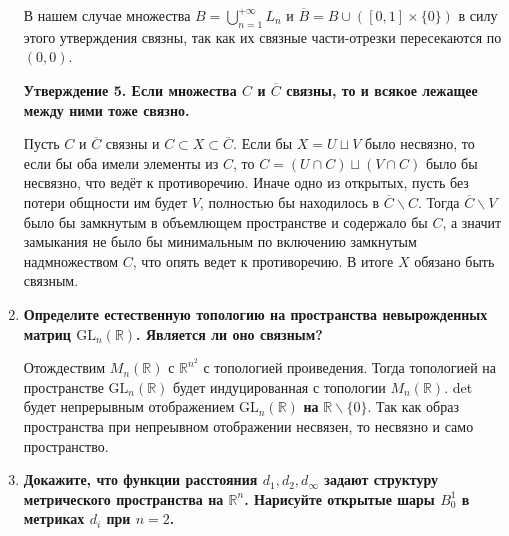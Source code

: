 \documentclass{article}
\begin{document}
\begin{enumerate}
    В нашем случае множества $B=\bigcup_{n=1}^{+\infty}L_n$ и $\overline{B}=B
    \cup([0,1]\times\{0\})$ в силу этого утверждения связны, так как их связные
    части-отрезки пересекаются по $(0,0)$.

    \textbf{Утверждение 5. Если множества $C$ и $\overline{C}$ связны, то и
    всякое лежащее между ними тоже связно.}

    Пусть $C$ и $\overline{C}$ связны и $C\subset X\subset\overline{C}$. Если
    бы $X=U\sqcup V$ было несвязно, то если бы оба имели элементы из $C$, то
    $C=(U\cap C)\sqcup (V\cap C)$ было бы несвязно, что ведёт к противоречию.
    Иначе одно из открытых, пусть без потери общности им будет $V$, полностью
    бы находилось в $\overline{C}\backslash C$. Тогда $\overline{C}\backslash V$
    было бы замкнутым в объемлющем пространстве и содержало бы $C$, а значит
    замыкания не было бы минимальным по включению замкнутым надмножеством $C$,
    что опять ведет к противоречию. В итоге $X$ обязано быть связным.


    \item \textbf{Определите естественную топологию на пространства
        невырожденных матриц $\text{GL}_n(\mathbb{R})$. Является ли оно связным?}
    
    Отождествим $M_n(\mathbb{R})$ с $\mathbb{R}^{n^2}$ с топологией проиведения.
    Тогда топологией на пространстве $\text{GL}_n(\mathbb{R})$ будет
    индуцированная с топологии $M_n(\mathbb{R})$. det будет непрерывным
    отображением $\text{GL}_n(\mathbb{R})$ \textbf{на} $\mathbb{R}\backslash\{0\}$.
    Так как образ пространства при непреывном отображении несвязен, то несвязно и
    само пространство.
        
    \item \textbf{Докажите, что функции расстояния $d_1,d_2,d_\infty$ задают
        структуру метрического пространства на $\mathbb{R}^n$. Нарисуйте открытые
        шары $B_0^1$ в метриках $d_i$ при $n=2$.}


\end{enumerate}
\end{document}
